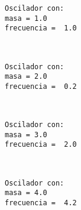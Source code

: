\documentclass[11pt]{article}
\begin{document}
    \begin{Verbatim}[commandchars=\\\{\}]
Oscilador con:
masa = 1.0
frecuencia =  1.0

    \end{Verbatim}

    \begin{center}
    \end{center}
    { \hspace*{\fill} \\}
    
    \begin{Verbatim}[commandchars=\\\{\}]
Oscilador con:
masa = 2.0
frecuencia =  0.2

    \end{Verbatim}

    \begin{center}
    \end{center}
    { \hspace*{\fill} \\}
    
    \begin{Verbatim}[commandchars=\\\{\}]
Oscilador con:
masa = 3.0
frecuencia =  2.0

    \end{Verbatim}

    \begin{center}
    \end{center}
    { \hspace*{\fill} \\}
    
    \begin{Verbatim}[commandchars=\\\{\}]
Oscilador con:
masa = 4.0
frecuencia =  4.2

    \end{Verbatim}

    \begin{center}
    \end{center}
    { \hspace*{\fill} \\}
    
\end{document}
